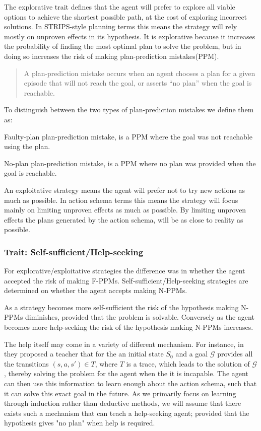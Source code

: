 \documentclass[../Master.tex]{subfiles}
\begin{document}
	The explorative trait defines that the agent will prefer to explore all viable options to achieve the shortest possible path, at the cost of exploring incorrect solutions.
	In STRIPS-style planning terms this means the strategy will rely mostly on unproven effects in its hypothesis.
	It is explorative because it increases the probability of finding the most optimal plan to solve the problem,
	but in doing so increases the risk of making plan-prediction mistakes(PPM).
	\begin{quotation}
				A plan-prediction mistake occurs when an
				agent chooses a plan for a given episode that will not reach
				the goal, or asserts “no plan” when the goal is reachable. \cite{Walsh2008}
	\end{quotation}
	To distinguish between the two types of plan-prediction mistakes we define them as:

	\begin{definition} 
		[F-PPM] Faulty-plan plan-prediction mistake, is a PPM where the goal was not reachable using the plan.
	\end{definition}
	\begin{definition}
		[N-PPM] No-plan plan-prediction mistake, is a PPM where no plan was provided when the goal is reachable.
	\end{definition}
	An exploitative strategy means the agent will prefer not to try new actions as much as possible.
	In action schema terms this means the strategy will focus mainly on limiting unproven effects as much as possible.
	By limiting unproven effects the plans generated by the action schema, will be as close to reality as possible.




\subsubsection{Trait: Self-sufficient/Help-seeking}

	For explorative/exploitative strategies the difference was in whether the agent accepted the risk of making F-PPMs.
	Self-sufficient/Help-seeking strategies are determined on whether the agent accepts making N-PPMs.

	As a strategy becomes more self-sufficient the risk of the hypothesis making N-PPMs diminishes, provided that the problem is solvable.
	Conversely as the agent becomes more help-seeking the risk of the hypothesis making N-PPMs increases.

	The help itself may come in a variety  of different mechanism.
	For instance, in \cite{Walsh2008} they proposed a teacher that for the an initial state $S_0$ and a goal $\mathcal{G}$ provides all the transitions $(s,a,s') \in T$, where $T$ is a trace, which leads to the solution of $\mathcal{G}$,
	 thereby solving the problem for the agent when the it is incapable.
	The agent can then use this information to learn enough about the action schema, such that it can solve this exact goal in the future.
	As we primarily focus on learning through induction rather than deductive methods, we will assume that there exists such a mechanism that can teach a help-seeking agent;
	provided that the hypothesis gives "no plan" when help is required.
\end{document}
